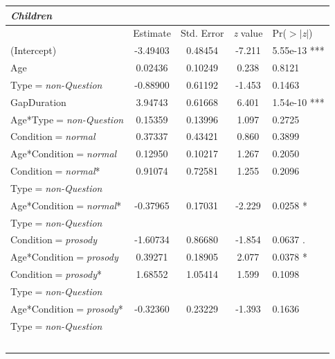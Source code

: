 \documentclass[authoryear, 12pt]{elsarticle}
\begin{document}
\linespread{1}
\begin{minipage}[t]{0.95\linewidth}
\begin{footnotesize}
\begin{longtable}{lcccl}
  \textbf{\textit{Children}} &&&& \\
    \hline
           &  Estimate & Std. Error & \textit{z} value & Pr($>$$|$\textit{z}$|$) \\    
    \hline
    (Intercept)											& -3.49403		& 0.48454		& -7.211	& 5.55e-13 ***    	\\
    Age														& 0.02436		& 0.10249		& 0.238	& 0.8121        		\\
    Type$=$\textit{non-Question}			& -0.88900		& 0.61192		& -1.453	& 0.1463        		\\
    GapDuration												& 3.94743		& 0.61668		& 6.401	& 1.54e-10 ***    	\\
    Age*Type$=$\textit{non-Question}	& 0.15359		& 0.13996		& 1.097	& 0.2725        		\\
	\hline
    Condition$=$\textit{normal}				& 0.37337		& 0.43421		& 0.860	& 0.3899        		\\
    Age*Condition$=$\textit{normal}		& 0.12950		& 0.10217		& 1.267	& 0.2050        		\\
    Condition$=$\textit{normal}*			& 0.91074		& 0.72581		& 1.255	& 0.2096        		\\
    \hspace*{5mm} Type$=$\textit{non-Question} &&&& \\
    Age*Condition$=$\textit{normal}*	& -0.37965		& 0.17031		& -2.229	& 0.0258 *      		\\
    \hspace*{5mm} Type$=$\textit{non-Question} &&&& \\
	\hline
    Condition$=$\textit{prosody}			& -1.60734		& 0.86680		& -1.854	& 0.0637 .      		\\
    Age*Condition$=$\textit{prosody}	& 0.39271		& 0.18905		& 2.077	& 0.0378 *      		\\
    Condition$=$\textit{prosody}*			& 1.68552		& 1.05414		& 1.599	& 0.1098        		\\
    \hspace*{5mm} Type$=$\textit{non-Question} &&&& \\
    Age*Condition$=$\textit{prosody}*	& -0.32360		& 0.23229		& -1.393	& 0.1636        		\\
    \hspace*{5mm} Type$=$\textit{non-Question} &&&& \\
$$
\end{longtable}
\end{footnotesize}
\end{minipage}
\end{document}

